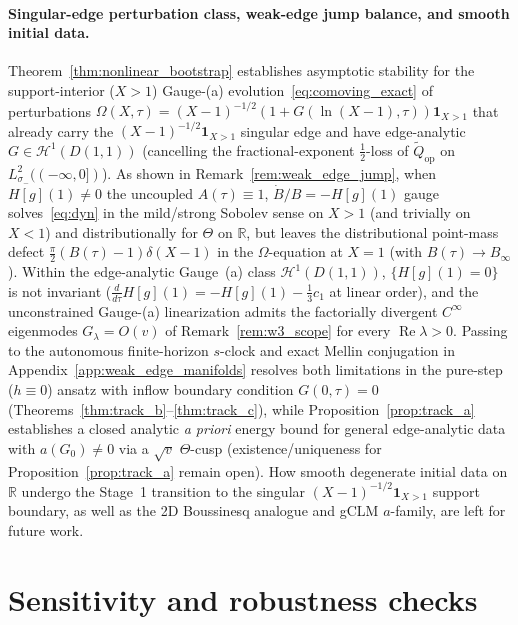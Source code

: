 \documentclass[11pt,a4paper]{article}
\begin{document}
\paragraph{Singular-edge perturbation class, weak-edge jump balance, and smooth initial data.}
Theorem~\ref{thm:nonlinear_bootstrap} establishes asymptotic stability for the support-interior
($X>1$) Gauge-(a) evolution~\eqref{eq:comoving_exact} of perturbations
$\Omega(X,\tau)=(X-1)^{-1/2}(1+G(\ln(X-1),\tau))\mathbf{1}_{X>1}$ that already carry the
$(X-1)^{-1/2}\mathbf{1}_{X>1}$ singular edge and have edge-analytic $G\in\mathcal{H}^1(D(1,1))$
(cancelling the fractional-exponent $\frac{1}{2}$-loss of $\widetilde{Q}_{\mathrm{op}}$ on
$L^2_{\sigma_-}((-\infty,0])$).  As shown in Remark~\ref{rem:weak_edge_jump}, when $H[g](1)\ne 0$
the uncoupled $A(\tau)\equiv 1$, $\dot B/B=-H[g](1)$ gauge solves~\eqref{eq:dyn} in the mild/strong
Sobolev sense on $X>1$ (and trivially on $X<1$) and distributionally for $\Theta$ on $\mathbb{R}$, but leaves the distributional
point-mass defect $\tfrac{\pi}{2}(B(\tau)-1)\delta(X-1)$ in the $\Omega$-equation at $X=1$
(with $B(\tau)\to B_\infty$).  Within the edge-analytic Gauge~(a) class $\mathcal{H}^1(D(1,1))$,
$\{H[g](1)=0\}$ is not invariant ($\frac{d}{d\tau}H[g](1)=-H[g](1)-\tfrac13 c_1$ at linear order),
and the unconstrained Gauge-(a) linearization admits the factorially divergent $C^\infty$
eigenmodes $G_\lambda=O(v)$ of Remark~\ref{rem:w3_scope} for every $\operatorname{Re}\lambda>0$.
Passing to the autonomous finite-horizon $s$-clock and exact Mellin conjugation in
Appendix~\ref{app:weak_edge_manifolds} resolves both limitations in the pure-step ($h\equiv 0$)
ansatz with inflow boundary condition $G(0,\tau)=0$ (Theorems~\ref{thm:track_b}--\ref{thm:track_c}),
while Proposition~\ref{prop:track_a} establishes a closed analytic \emph{a priori} energy bound for
general edge-analytic data with $a(G_0)\ne 0$ via a $\sqrt{v}$ $\Theta$-cusp (existence/uniqueness
for Proposition~\ref{prop:track_a} remain open).
How smooth degenerate initial data on $\mathbb{R}$ undergo the Stage~1 transition to the singular
$(X-1)^{-1/2}\mathbf{1}_{X>1}$ support boundary, as well as the 2D Boussinesq analogue and
gCLM $a$-family, are left for future work.

\section{Sensitivity and robustness checks}
\end{document}

